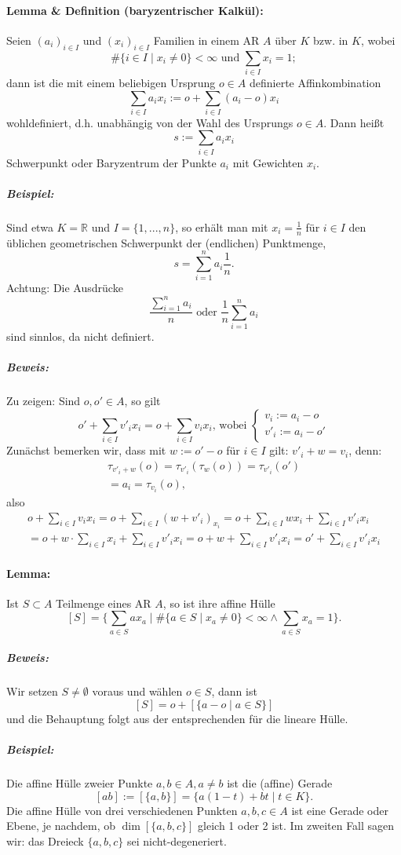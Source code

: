 \paragraph{Lemma \& Definition (baryzentrischer Kalkül): }
	\begin{Definition}
		Seien $(a_i)_{i\in I}$ und $(x_i)_{i\in I}$ Familien in einem AR $ A $ über $ K $ bzw. in $ K $, wobei
		\[ \#\{i\in I\mid x_i\neq 0\}<\infty \text{ und } \sum_{i\in I}x_i=1; \]
		dann ist die mit einem beliebigen Ursprung $ o\in A $ definierte Affinkombination	
		\[ \sum_{i\in I}a_ix_i := o+\sum_{i\in I} (a_i-o)x_i \]
		wohldefiniert, d.h. unabhängig von der Wahl des Ursprungs $ o\in A $.
		Dann heißt 
		\[ s:= \sum_{i\in I} a_ix_i \]
		Schwerpunkt oder Baryzentrum der Punkte $ a_i $ mit Gewichten $ x_i $.
	\end{Definition}
\subparagraph{Beispiel: }
	Sind etwa $ K=\mathbb{R} $ und $ I = \{1,...,n\} $, so erhält man mit $ x_i = \frac{1}{n} $ für $ {i\in I} $ den üblichen geometrischen Schwerpunkt der (endlichen) Punktmenge,
		\[ s =\sum_{i=1}^{n}a_i\frac{1}{n}. \]
	Achtung: Die Ausdrücke
		\[ \frac{\sum_{i =1}^{n}a_i}{n}\text{ oder } \frac{1}{n}\sum_{i=1}^{n}a_i \]
	sind sinnlos, da nicht definiert.
\subparagraph{Beweis: }
	Zu zeigen: Sind $ o,o'\in A $, so gilt
	\[ o'+\sum_{i\in I} v'_ix_i = o+\sum_{i\in I} v_ix_i \text{, wobei }
		\begin{cases}
		v_i := a_i-o\\
		v'_i := a_i-o'
		\end{cases}\]
	Zunächst bemerken wir, dass mit $ w:= o'-o $ für $ {i\in I} $ gilt: $ v'_i+w=v_i $, denn:
	\begin{gather*}
		\tau_{v'_i+w}(o) = \tau_{v'_i}(\tau_w(o)) = \tau_{v'_i}(o')\\
		= a_i = \tau_{v_i}(o),
	\end{gather*}
	also
	\begin{gather*}
		o+\sum_{i\in I}v_ix_i = o+\sum_{i\in I} (w+v'_i)_{x_i} = o+ \sum_{i\in I}wx_i + \sum_{i\in I}v'_ix_i\\
		= o+ w\cdot \sum_{i\in I}x_i + \sum_{i\in I}v'_i x_i = o+w + \sum_{i\in I}v'_ix_i = o' + \sum_{i\in I}v'_i x_i
	\end{gather*}
\paragraph{Lemma: }
	\begin{Lemma}
		Ist $ S\subset A $ Teilmenge eines AR $ A $, so ist ihre affine Hülle
		\[ [S] = \{\sum_{a\in S}ax_a\mid \#\{a\in S\mid x_a\neq 0\}<\infty \land \sum_{a\in S}x_a = 1 \}. \]
	\end{Lemma}
\subparagraph{Beweis: }
	Wir setzen $ S\neq \emptyset $ voraus und wählen $ o\in S $, dann ist
	\[ [S] = o+[\{a-o\mid a\in S\}] \]
	und die Behauptung folgt aus der entsprechenden für die lineare Hülle.
\subparagraph{Beispiel: }
	Die affine Hülle zweier Punkte $ a,b\in A, a\neq b $ ist die (affine) Gerade
	\[ [ab] := [\{a,b\}] = \{a(1-t)+bt\mid t\in K\}. \]
	Die affine Hülle von drei verschiedenen Punkten $ a,b,c\in A $ ist eine Gerade oder Ebene, je nachdem, ob $ \dim[\{a,b,c\}] $ gleich 1 oder 2 ist. Im zweiten Fall sagen wir: das Dreieck $ \{a,b,c\} $ sei nicht-degeneriert.
